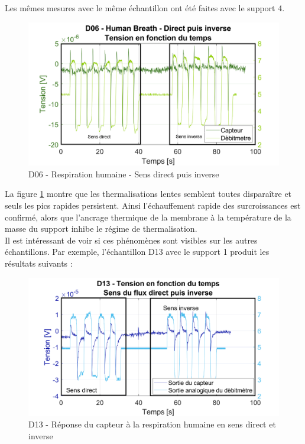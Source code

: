 Les mêmes mesures avec le même échantillon ont été faites avec le support 4. 
\begin{figure}[H]
    \centering
    \includegraphics[scale = 0.6]{assets/figures/D06_hb_direct_inverse_green.svg}
    \caption{D06 - Respiration humaine - Sens direct puis inverse}
    \label{fig:d06_hb_dirInv}
\end{figure}
La figure \ref{fig:d06_hb_dirInv} montre que les thermalisations lentes semblent toutes disparaître et seuls les pics rapides persistent. Ainsi 
l'échauffement rapide des surcroissances est confirmé, alors que l'ancrage thermique de la membrane à la température de la masse du support 
inhibe le régime de thermalisation. \\

\newpage
Il est intéressant de voir si ces phénomènes sont visibles sur les autres échantillons. Par exemple, l'échantillon D13 avec le support 1 produit les résultats suivants :
\begin{figure}[H]
    \centering
    \includegraphics[scale = 0.6]{assets/figures/D13_human_breath_direct_invert_blue.svg}
    \caption{D13 - Réponse du capteur à la respiration humaine en sens direct et inverse}
    \label{fig:D13_human_breath_direct_invert}
\end{figure}

